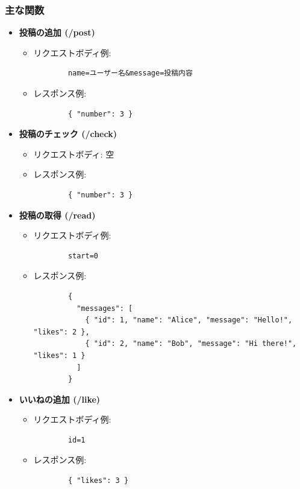 \documentclass[uplatex,dvipdfmx]{jsarticle}
\begin{document}
\subsubsection*{主な関数}
\begin{itemize}
  \item \textbf{投稿の追加 (/post)}
    \begin{itemize}
      \item リクエストボディ例:
        \begin{verbatim}
        name=ユーザー名&message=投稿内容
        \end{verbatim}
      \item レスポンス例:
        \begin{verbatim}
        { "number": 3 }
        \end{verbatim}
    \end{itemize}

  \item \textbf{投稿のチェック (/check)}
    \begin{itemize}
      \item リクエストボディ: 空
      \item レスポンス例:
        \begin{verbatim}
        { "number": 3 }
        \end{verbatim}
    \end{itemize}

  \item \textbf{投稿の取得 (/read)}
    \begin{itemize}
      \item リクエストボディ例:
        \begin{verbatim}
        start=0
        \end{verbatim}
      \item レスポンス例:
        \begin{verbatim}
        {
          "messages": [
            { "id": 1, "name": "Alice", "message": "Hello!", "likes": 2 },
            { "id": 2, "name": "Bob", "message": "Hi there!", "likes": 1 }
          ]
        }
        \end{verbatim}
    \end{itemize}

  \item \textbf{いいねの追加 (/like)}
    \begin{itemize}
      \item リクエストボディ例:
        \begin{verbatim}
        id=1
        \end{verbatim}
      \item レスポンス例:
        \begin{verbatim}
        { "likes": 3 }
        \end{verbatim}
    \end{itemize}


\end{itemize}
\end{document}
